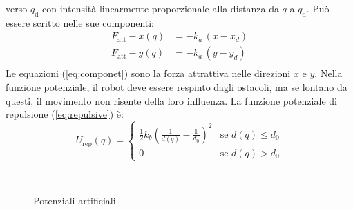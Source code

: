 verso $q_{\text{d}}$ con intensità linearmente proporzionale alla distanza da
$q$ a $q_{\text{d}}$. Può essere scritto nelle sue componenti:
\begin{equation}
\label{eq:componet}
\begin{split}
F_{\text{att}} -x(q) &= -k_a \, (x - x_d)\\
F_{\text{att}} -y(q) &= -k_a \, (y - y_d)\\
\end{split}
\end{equation}
%
Le equazioni (\ref{eq:componet}) sono la forza attrattiva nelle direzioni $x$
e $y$. Nella funzione potenziale, il robot deve essere respinto dagli ostacoli,
ma se lontano da questi, il movimento non risente della loro influenza.
La funzione potenziale di repulsione (\ref{eq:repulsive}) è:
\begin{equation}
\label{eq:repulsive}
U_{\text{rep}}(q) =
\begin{cases}
\frac{1}{2}k_b(\frac{1}{d(q)}-\frac{1}{d_0})^2 &\mbox{se } d(q) \leq d_0 \\
0 & \mbox{se } d(q) > d_0
\end{cases}
\end{equation}
\begin{figure}[!h]
\centering
{} \,
\caption{Potenziali artificiali}
\label{fig:potentialfield}
\end{figure}
